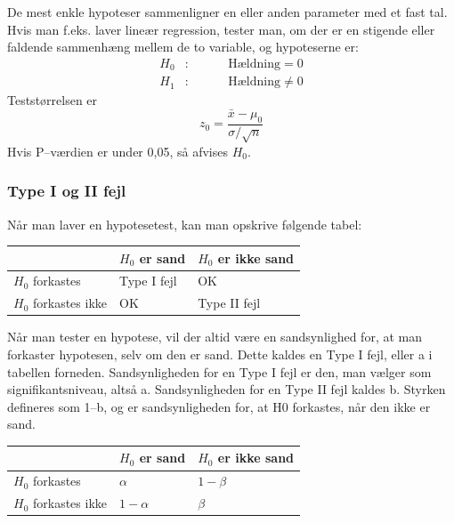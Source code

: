 \documentclass[11pt]{article}
\begin{document}
De mest enkle hypoteser sammenligner en eller anden parameter med et fast tal. Hvis man f.eks. laver lineær regression, tester man, om der er en stigende eller faldende sammenhæng mellem de to variable, og hypoteserne er:
\begin{eqnarray*}
H_0&:&\hspace{1cm}\text{Hældning}=0\\
H_1&:&\hspace{1cm}\text{Hældning}\neq 0
\end{eqnarray*}
Teststørrelsen er 
$$z_0=\frac{\bar{x}-\mu_0}{\sigma/\sqrt{n}}$$
Hvis P--værdien er under 0,05, så afvises $H_0$. 
\subsubsection{Type I og II fejl}
Når man laver en hypotesetest, kan man opskrive følgende tabel:
\begin{table}[H]
\centering
\begin{tabular}{|l|l|l|}
\hline
                     & $H_0$ er sand & $H_0$ er ikke sand \\ \hline
$H_0$ forkastes      & Type I fejl                           & OK                                         \\ \hline
$H_0$ forkastes ikke & OK                                    & Type II fejl                               \\ \hline
\end{tabular}
\end{table}
Når man tester en hypotese, vil der altid være en sandsynlighed for, at man forkaster hypotesen, selv om den er sand. Dette kaldes en Type I fejl, eller a i tabellen forneden. Sandsynligheden for en Type I fejl er den, man vælger som signifikantsniveau, altså a. Sandsynligheden for en Type II fejl kaldes b. Styrken defineres som 1--b, og er sandsynligheden for, at H0 forkastes, når den ikke er sand.
\begin{table}[H]
\centering
\begin{tabular}{|l|l|l|}
\hline
                     & $H_0$ er sand & $H_0$ er ikke sand \\ \hline
$H_0$ forkastes      & $\alpha$                           & $1-\beta$                                        \\ \hline
$H_0$ forkastes ikke & $1-\alpha$                                    & $\beta$                                        \\ \hline
\end{tabular}
\end{table}
\end{document}
